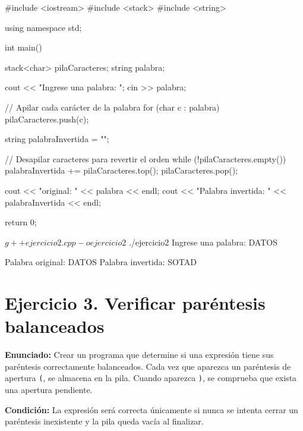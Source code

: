 \documentclass[11pt, a4paper]{article}
\begin{document}
\begin{codebox}[title={CÓDIGO FUENTE: Ejercicio 2}]
#include <iostream>
#include <stack>
#include <string>

using namespace std;

int main() {
    stack<char> pilaCaracteres;
    string palabra;

    cout << "Ingrese una palabra: ";
    cin >> palabra;

    // Apilar cada carácter de la palabra
    for (char c : palabra) {
        pilaCaracteres.push(c);
    }

    string palabraInvertida = "";

    // Desapilar caracteres para revertir el orden
    while (!pilaCaracteres.empty()) {
        palabraInvertida += pilaCaracteres.top();
        pilaCaracteres.pop();
    }

    cout << "\nPalabra original: " << palabra << endl;
    cout << "Palabra invertida: " << palabraInvertida << endl;

    return 0;
}
\end{codebox}

\begin{terminalout}
$ g++ ejercicio2.cpp -o ejercicio2
$ ./ejercicio2
Ingrese una palabra: DATOS

Palabra original: DATOS
Palabra invertida: SOTAD
\end{terminalout}

\newpage

\section*{Ejercicio 3. Verificar paréntesis balanceados}

\textbf{Enunciado:} Crear un programa que determine si una expresión tiene sus paréntesis correctamente balanceados. Cada vez que aparezca un paréntesis de apertura \texttt{(}, se almacena en la pila. Cuando aparezca \texttt{)}, se comprueba que exista una apertura pendiente.

\textbf{Condición:} La expresión será correcta únicamente si nunca se intenta cerrar un paréntesis inexistente y la pila queda vacía al finalizar.
\end{document}
